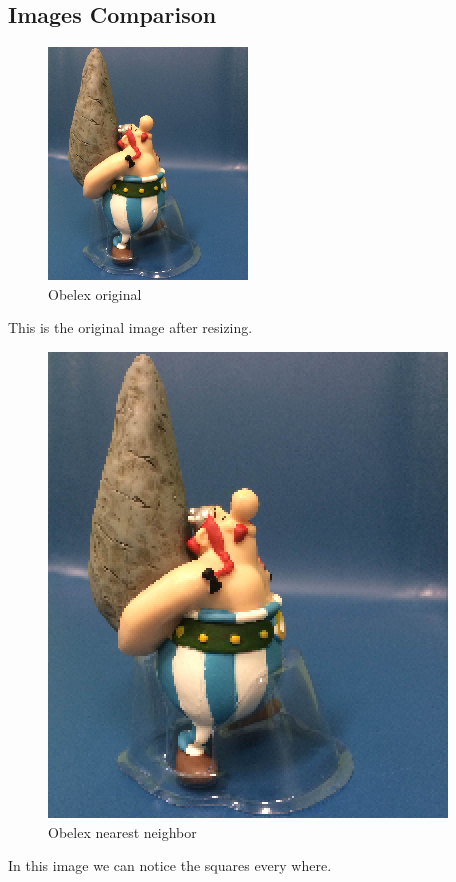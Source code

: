 \documentclass{article}
\begin{document}
\subsection*{Images Comparison}
\begin{figure}[H]
	\begin{center}
		\includegraphics[scale=1]{Obelexorignalgrayscal.png}
		\end{center}
		\caption{Obelex original} 
		\end{figure}
This is the original image after resizing.
\begin{figure}[H]
	\begin{center}
		\includegraphics[scale=1]{ObelexNearst.png}
	\end{center}
	\caption{Obelex nearest  neighbor}
\end{figure}
In this image we can notice the squares every where.
\end{document}

